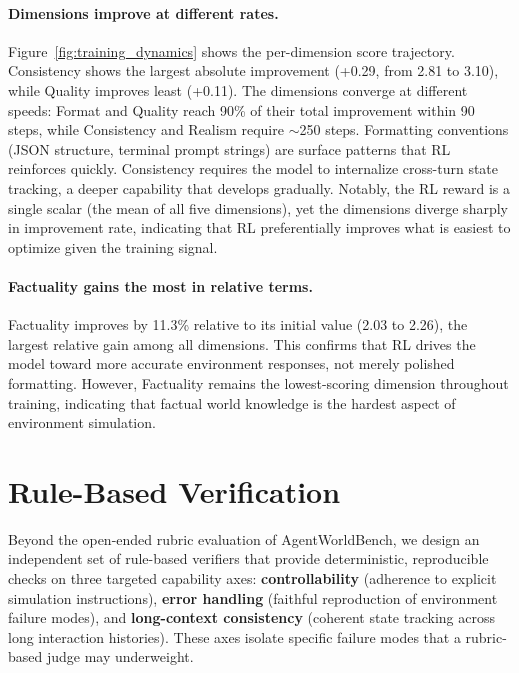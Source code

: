 \documentclass{llmxive}
\providecommand{\bench}{AgentWorldBench\xspace}
\begin{document}
\paragraph{Dimensions improve at different rates.}
Figure~\ref{fig:training_dynamics} shows the per-dimension score trajectory.
Consistency shows the largest absolute improvement (+0.29, from 2.81 to 3.10), while Quality improves least (+0.11).
The dimensions converge at different speeds: Format and Quality reach 90\% of their total improvement within 90 steps, while Consistency and Realism require $\sim$250 steps.
Formatting conventions (JSON structure, terminal prompt strings) are surface patterns that RL reinforces quickly. Consistency requires the model to internalize cross-turn state tracking, a deeper capability that develops gradually.
Notably, the RL reward is a single scalar (the mean of all five dimensions), yet the dimensions diverge sharply in improvement rate, indicating that RL preferentially improves what is easiest to optimize given the training signal.

\paragraph{Factuality gains the most in relative terms.}
Factuality improves by 11.3\% relative to its initial value (2.03 to 2.26), the largest relative gain among all dimensions.
This confirms that RL drives the model toward more accurate environment responses, not merely polished formatting.
However, Factuality remains the lowest-scoring dimension throughout training, indicating that factual world knowledge is the hardest aspect of environment simulation.


\section{Rule-Based Verification}
\label{sec:appendix:rulebased}

Beyond the open-ended rubric evaluation of \bench, we design an independent set of rule-based verifiers that provide deterministic, reproducible checks on three targeted capability axes: \textbf{controllability} (adherence to explicit simulation instructions), \textbf{error handling} (faithful reproduction of environment failure modes), and \textbf{long-context consistency} (coherent state tracking across long interaction histories).
These axes isolate specific failure modes that a rubric-based judge may underweight.
\end{document}
